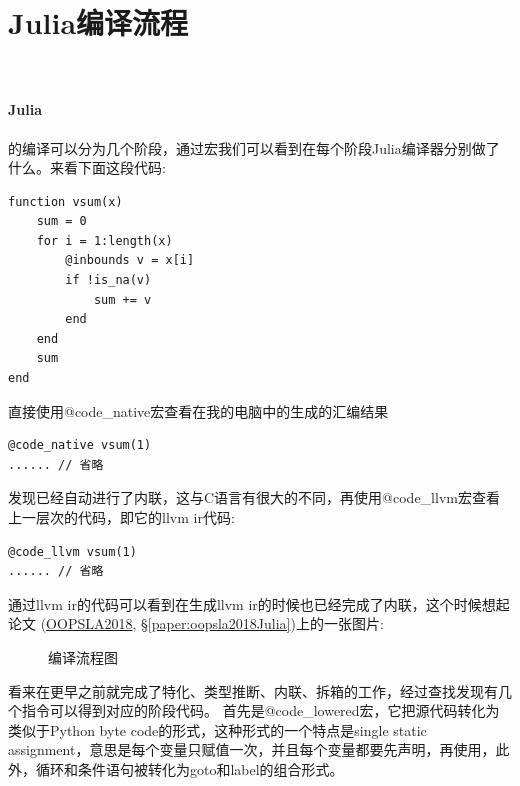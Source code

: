 \section{Julia编译流程}
\label{sec:julia:complier_process}
　\paragraph{Julia}的编译可以分为几个阶段，通过宏我们可以看到在每个阶段Julia编译器分别做了什么。来看下面这段代码:
  \begin{lstlisting}
function vsum(x)
    sum = 0
    for i = 1:length(x)
        @inbounds v = x[i]
        if !is_na(v)
            sum += v
        end
    end
    sum
end
\end{lstlisting}
直接使用@code\_native宏查看在我的电脑中的生成的汇编结果
\begin{lstlisting}
@code_native vsum(1)
...... // 省略
\end{lstlisting}
发现已经自动进行了内联，这与C语言有很大的不同，再使用@code\_llvm宏查看上一层次的代码，即它的llvm ir代码:
\begin{lstlisting}
@code_llvm vsum(1)
...... // 省略
\end{lstlisting}
通过llvm ir的代码可以看到在生成llvm ir的时候也已经完成了内联，这个时候想起论文\cite{bezanson2018Julia}
(\href{https://dl.acm.org/citation.cfm?id=3276490}{OOPSLA2018}, 
\S\ref{paper:oopsla2018Julia})上的一张图片:

\begin{figure}[h]  
\centering
{}
\caption{编译流程图}
\end{figure}

看来在更早之前就完成了特化、类型推断、内联、拆箱的工作，经过查找发现有几个指令可以得到对应的阶段代码。
首先是@code\_lowered宏，它把源代码转化为类似于Python byte code的形式，这种形式的一个特点是single static assignment，意思是每个变量只赋值一次，并且每个变量都要先声明，再使用，此外，循环和条件语句被转化为goto和label的组合形式。

